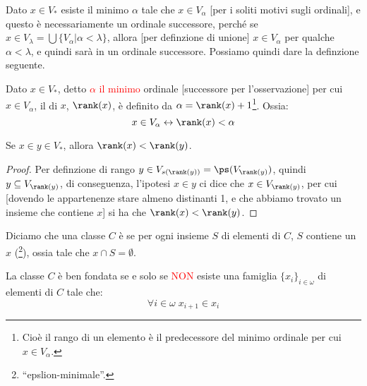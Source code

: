 \documentclass[11pt]{scrartcl}
\begin{document}
\begin{remark}
	Dato $x \in V_*$ esiste il minimo $\alpha$ tale che $x \in V_\alpha$ [per i soliti motivi sugli ordinali], e questo è necessariamente un ordinale successore, perché se $x \in V_\lambda = \bigcup\{V_\alpha | \alpha < \lambda\}$, allora [per definzione di unione] $x \in V_\alpha$
	per qualche $\alpha < \lambda$, e quindi sarà in un ordinale successore. Possiamo quindi dare la definzione seguente.
\end{remark}

\begin{definition}[Rango in $V_*$]
	Dato $x \in V_*$, detto \textcolor{red}{$\alpha$ il minimo} ordinale [successore per l'osservazione] per cui $x \in V_\alpha$, il  di $x$, $\rank(x)$, è definito da $\alpha = \rank(x) + 1$\footnote{Cioè il rango di un elemento
	è il predecessore del minimo ordinale per cui $x \in V_\alpha$.}. Ossia:
	\[ x \in V_\alpha \leftrightarrow \rank(x) < \alpha
		\]
\end{definition}

\begin{lemma}
	Se $x \in y \in V_*$, allora $\rank(x) < \rank(y)$.
\end{lemma}

\begin{proof}
	Per definzione di rango $y \in V_{s(\rank(y))} = \ps(V_{\rank(y)})$, quindi $y \subseteq V_{\rank(y)}$, di conseguenza, l'ipotesi $x \in y$ ci dice che $x \in V_{\rank(y)}$, per cui [dovendo le appartenenze stare almeno distinanti 1, e che abbiamo trovato un insieme che contiene $x$] si ha che $\rank(x) < \rank(y)$.
\end{proof}

\begin{definition}
	Diciamo che una classe $C$ è  se per ogni insieme $S$ di elementi di $C$, $S$ contiene un $x$  (\footnote{\;``epslion-minimale''.}),
	ossia tale che $x \cap S = \emptyset$.
\end{definition}

\begin{proposition}
	La classe $C$ è ben fondata se e solo se \textcolor{red}{NON} esiste una famiglia $\{x_i\}_{i \in \omega}$ di elementi di $C$ tale che:
	\[ \forall i \in \omega \; x_{i+1}\in x_i
		\]
\end{proposition}
\end{document}
